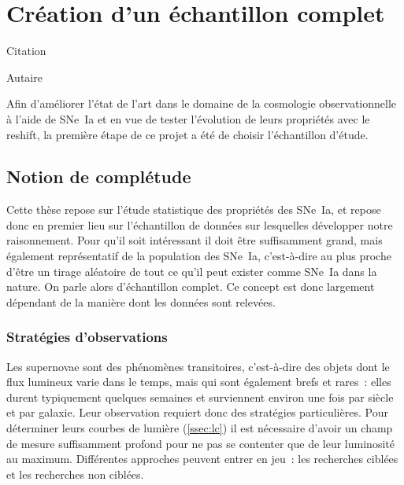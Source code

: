 \documentclass[../main/main.tex]{subfiles}
\begin{document}
\chapter{Cr\'eation d'un \'echantillon complet}\label{ch:sample}

\epigraph{Citation}{Autaire}

Afin d'améliorer l'état de l'art dans le domaine de la cosmologie
observationnelle à l'aide de SNe~Ia et en vue de tester l'évolution de leurs
propriétés avec le reshift, la première étape de ce projet a été de choisir
l'échantillon d'étude.

\minitoc
\newpage

\section{Notion de complétude}\label{sec:compl}

Cette thèse repose sur l'étude statistique des propriétés des SNe~Ia, et repose
donc en premier lieu sur l'échantillon de données sur lesquelles développer
notre raisonnement. Pour qu'il soit intéressant il doit être suffisamment grand,
mais également représentatif de la population des SNe~Ia, c'est-à-dire au plus
proche d'être un tirage aléatoire de tout ce qu'il peut exister comme SNe~Ia
dans la nature. On parle alors d'échantillon complet. Ce concept est donc
largement dépendant de la manière dont les données sont relevées.

\subsection{Stratégies d'observations}\label{ssec:startobs}

Les supernovae sont des phénomènes transitoires, c'est-à-dire des objets dont le
flux lumineux varie dans le temps, mais qui sont également brefs et rares~:
elles durent typiquement quelques semaines et surviennent environ une fois par
siècle et par galaxie. Leur observation requiert donc des stratégies
particulières. Pour déterminer leurs courbes de lumière (\ref{ssec:lc}) il est
nécessaire d'avoir un champ de mesure suffisamment profond pour ne pas se
contenter que de leur luminosité au maximum. Différentes approches peuvent
entrer en jeu~: les recherches ciblées et les recherches non ciblées.
\end{document}
